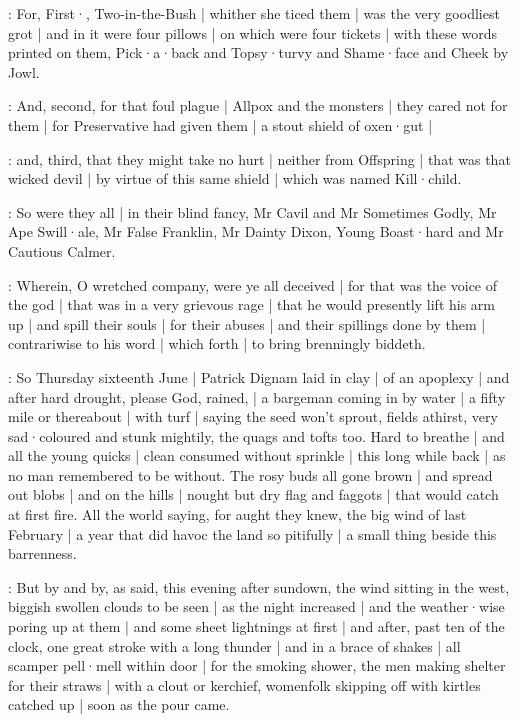 :
For,
First·,
Two-in-the-Bush |
whither she ticed them |
was the very goodliest grot |
and in it were four pillows |
on which were four tickets |
with these words printed on them,
Pick·a·back and Topsy·turvy and Shame·face and Cheek by Jowl.

:
And,
second,
for that foul plague |
Allpox and the monsters |
they cared not for them |
for Preservative had given them |
a stout shield of oxen·gut |

:
and,
third,
that they might take no hurt |
neither from Offspring |
that was that wicked devil |
by virtue of this same shield |
which was named Kill·child.

:
So were they all |
in their blind fancy,
Mr Cavil and Mr Sometimes Godly,
Mr Ape Swill·ale,
Mr False Franklin,
Mr Dainty Dixon,
Young Boast·hard
and Mr Cautious Calmer.

:
Wherein,
O wretched company,
were ye all deceived |
for that was the voice of the god |
that was in a very grievous rage |
that he would presently lift his arm up |
and spill their souls |
for their abuses |
and their spillings done by them |
contrariwise to his word |
which forth |
to bring brenningly biddeth.



:
So Thursday sixteenth June |
Patrick Dignam laid in clay |
of an apoplexy |
and after hard drought,
please God,
rained, |
a bargeman coming in by water |
a fifty mile or thereabout |
with turf |
saying the seed won't sprout,
fields athirst,
very sad·coloured and stunk mightily,
the quags and tofts too.
Hard to breathe |
and all the young quicks |
clean consumed without sprinkle |
this long while back |
as no man remembered to be without.
The rosy buds all gone brown |
and spread out blobs |
and on the hills |
nought but dry flag and faggots |
that would catch at first fire.
All the world saying,
for aught they knew,
the big wind of last February |
a year that did havoc the land so pitifully |
a small thing beside this barrenness.

:
But by and by,
as said,
this evening after sundown,
the wind sitting in the west,
biggish swollen clouds to be seen |
as the night increased |
and the weather·wise poring up at them |
and some sheet lightnings at first |
and after,
past ten of the clock,
one great stroke with a long thunder |
and in a brace of shakes |
all scamper pell·mell within door |
for the smoking shower,
the men making shelter for their straws |
with a clout or kerchief,
womenfolk skipping off with kirtles catched up |
soon as the pour came.

